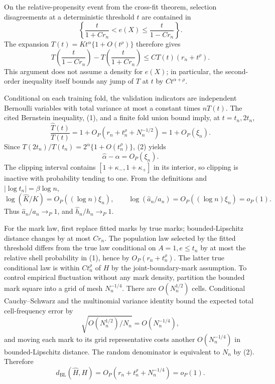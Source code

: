 On the relative-propensity event from the cross-fit theorem, selection disagreements at a deterministic threshold \(t\) are contained in
\[
 \left\{\frac{t}{1+Cr_n}<e(X)\leq\frac{t}{1-Cr_n}\right\}.
\]
The expansion \(T(t)=Kt^\alpha\{1+O(t^\rho)\}\) therefore gives
\[
 T\!\left(\frac{t}{1-Cr_n}\right)-T\!\left(\frac{t}{1+Cr_n}\right)
 \leq CT(t)(r_n+t^\rho). \tag{1}
\]
This argument does not assume a density for \(e(X)\); in particular, the second-order inequality itself bounds any jump of \(T\) at \(t\) by \(Ct^{\alpha+\rho}\).

Conditional on each training fold, the validation indicators are independent Bernoulli variables with total variance at most a constant times \(nT(t)\).  The cited Bernstein inequality, (1), and a finite fold union bound imply, at \(t=t_n,2t_n\),
\[
 \frac{\widehat T(t)}{T(t)}=1+O_P(r_n+t_n^\rho+N_n^{-1/2})=1+O_P(\xi_n). \tag{2}
\]
Since \(T(2t_n)/T(t_n)=2^\alpha\{1+O(t_n^\rho)\}\), (2) yields
\[
 \widehat\alpha-\alpha=O_P(\xi_n). \tag{3}
\]
The clipping interval contains \([1+\kappa_-,1+\kappa_+]\) in its interior, so clipping is inactive with probability tending to one.  From the definitions and \(|\log t_n|=\beta\log n\),
\[
 \log(\widehat K/K)=O_P((\log n)\xi_n),\qquad
 \log(\widehat a_n/a_n)=O_P((\log n)\xi_n)=o_P(1). \tag{4}
\]
Thus \(\widehat a_n/a_n\to_P1\), and \(\widehat h_n/h_n\to_P1\).

For the mark law, first replace fitted marks by true marks; bounded-Lipschitz distance changes by at most \(Cr_n\).  The population law selected by the fitted threshold differs from the true law conditional on \(A=1,e\leq t_n\) by at most the relative shell probability in (1), hence by \(O_P(r_n+t_n^\rho)\).  The latter true conditional law is within \(C t_n^\rho\) of \(H\) by the joint-boundary-mark assumption.  To control empirical fluctuation without any mark density, partition the bounded mark square into a grid of mesh \(N_n^{-1/4}\).  There are \(O(N_n^{1/2})\) cells.  Conditional Cauchy--Schwarz and the multinomial variance identity bound the expected total cell-frequency error by
\[
 \sqrt{O(N_n^{1/2})/N_n}=O(N_n^{-1/4}),
\]
and moving each mark to its grid representative costs another \(O(N_n^{-1/4})\) in bounded-Lipschitz distance.  The random denominator is equivalent to \(N_n\) by (2).  Therefore
\[
 d_{\mathrm{BL}}(\widehat H,H)
 =O_P(r_n+t_n^\rho+N_n^{-1/4})=o_P(1). \tag{5}
\]

